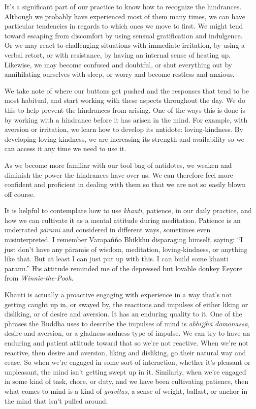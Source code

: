 It's a significant part of our practice to know how to recognize the 
hindrances. Although we probably have experienced most of them many 
times, we can have particular tendencies in regards to which ones we 
move to first. We might tend toward escaping from discomfort by using 
sensual gratification and indulgence. Or we may react to challenging 
situations with immediate irritation, by using a verbal retort, or with 
resistance, by having an internal sense of heating up. Likewise, we may 
become confused and doubtful, or shut everything out by annihilating 
ourselves with sleep, or worry and become restless and anxious.

We take note of where our buttons get pushed and the responses that 
tend to be most habitual, and start working with these aspects 
throughout the day. We do this to help prevent the hindrances from 
arising. One of the ways this is done is by working with a hindrance 
before it has arisen in the mind. For example, with aversion or 
irritation, we learn how to develop its antidote: loving-kindness. By 
developing loving-kindness, we are increasing its strength and 
availability so we can access it any time we need to use it.

As we become more familiar with our tool bag of antidotes, we weaken 
and diminish the power the hindrances have over us. We can therefore 
feel more confident and proficient in dealing with them so that we are 
not so easily blown off course.


It is helpful to contemplate how to use \emph{khanti}, patience, in our 
daily practice, and how we can cultivate it as a mental attitude during 
meditation. Patience is an underrated \emph{pāramī} and considered in 
different ways, sometimes even misinterpreted. I remember Varapañño 
Bhikkhu disparaging himself, saying: ``I just don't have any pāramīs 
of wisdom, meditation, loving-kindness, or anything like that. But at 
least I can just put up with this. I can build some khanti pāramī.'' 
His attitude reminded me of the depressed but lovable donkey Eeyore 
from \emph{Winnie-the-Pooh}.

Khanti is actually a proactive engaging with experience in a way that's 
not getting caught up in, or swayed by, the reactions and impulses of 
either liking or disliking, or of desire and aversion. It has an 
enduring quality to it. One of the phrases the Buddha uses to describe 
the impulses of mind is \emph{abhijjhā domanassa}, desire and 
aversion, or a gladness-sadness type of impulse. We can try to have an 
enduring and patient attitude toward that so we're not reactive. When 
we're not reactive, then desire and aversion, liking and disliking, go 
their natural way and cease. So when we're engaged in some sort of 
interaction, whether it's pleasant or unpleasant, the mind isn't 
getting swept up in it. Similarly, when we're engaged in some kind of 
task, chore, or duty, and we have been cultivating patience, then what 
comes to mind is a kind of \emph{gravitas}, a sense of weight, ballast, 
or anchor in the mind that isn't pulled around.

